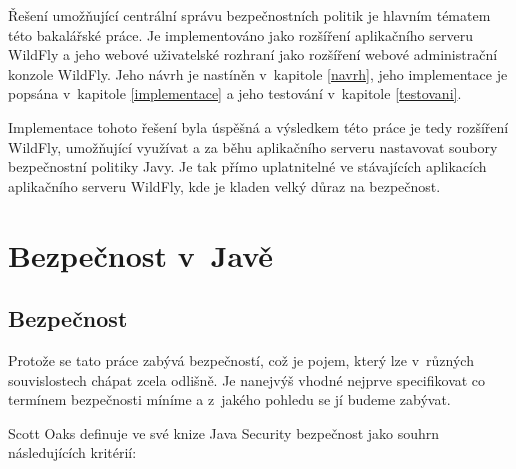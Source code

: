 Řešení umožňující centrální správu bezpečnostních politik je hlavním tématem této bakalářské práce.
Je implementováno jako rozšíření aplikačního serveru WildFly a jeho webové uživatelské rozhraní jako rozšíření webové administrační konzole WildFly.
Jeho návrh je nastíněn v~kapitole \ref{navrh}, jeho implementace je popsána v~kapitole \ref{implementace} a jeho testování v~kapitole \ref{testovani}.

Implementace tohoto řešení byla úspěšná a výsledkem této práce je tedy rozšíření WildFly, umožňující využívat a za běhu aplikačního serveru
nastavovat soubory bezpečnostní politiky Javy.
Je tak přímo uplatnitelné ve stávajících aplikacích aplikačního serveru WildFly, kde je kladen velký důraz na bezpečnost.

\chapter{Bezpečnost v~Javě} \label{teoretickyUvod}

\section{Bezpečnost}

Protože se tato práce zabývá bezpečností, což je pojem, který lze v~různých souvislostech chápat zcela odlišně. Je nanejvýš vhodné nejprve specifikovat co termínem bezpečnosti míníme a z~jakého pohledu se jí budeme zabývat.

Scott Oaks definuje ve své knize Java Security bezpečnost jako souhrn následujících kritérií: \cite{oaks}


